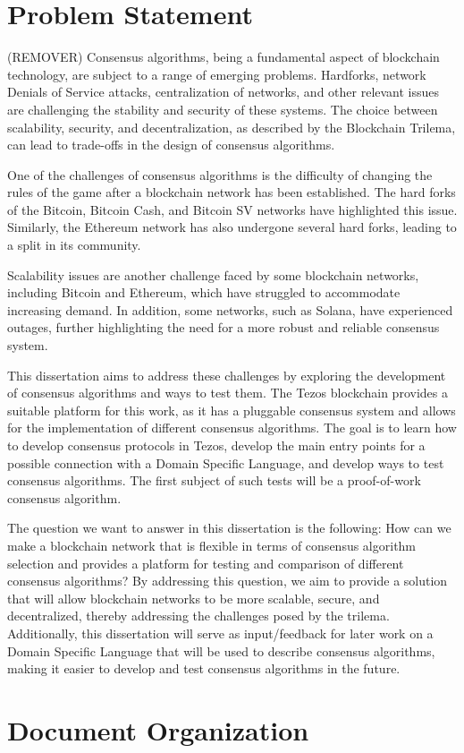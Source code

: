 \section*{Problem Statement}
(REMOVER)
Consensus algorithms, being a fundamental aspect of blockchain technology, are subject to a range of emerging problems. Hardforks, network Denials of Service attacks, centralization of networks, and other relevant issues are challenging the stability and security of these systems. The choice between scalability, security, and decentralization, as described by the Blockchain Trilema, can lead to trade-offs in the design of consensus algorithms.

One of the challenges of consensus algorithms is the difficulty of changing the rules of the game after a blockchain network has been established. The hard forks of the Bitcoin, Bitcoin Cash, and Bitcoin SV networks have highlighted this issue. Similarly, the Ethereum network has also undergone several hard forks, leading to a split in its community.

Scalability issues are another challenge faced by some blockchain networks, including Bitcoin and Ethereum, which have struggled to accommodate increasing demand. In addition, some networks, such as Solana, have experienced outages, further highlighting the need for a more robust and reliable consensus system.

This dissertation aims to address these challenges by exploring the development of consensus algorithms and ways to test them. The Tezos blockchain provides a suitable platform for this work, as it has a pluggable consensus system and allows for the implementation of different consensus algorithms. The goal is to learn how to develop consensus protocols in Tezos, develop the main entry points for a possible connection with a Domain Specific Language, and develop ways to test consensus algorithms. 
The first subject of such tests will be a proof-of-work consensus algorithm.

The question we want to answer in this dissertation is the following: How can we make a blockchain network that is flexible in terms of consensus algorithm selection and provides a platform for testing and comparison of different consensus algorithms? By addressing this question, we aim to provide a solution that will allow blockchain networks to be more scalable, secure, and decentralized, thereby addressing the challenges posed by the trilema. Additionally, this dissertation will serve as input/feedback for later work on a Domain Specific Language that will be used to describe consensus algorithms, making it easier to develop and test consensus algorithms in the future.

\section{Document Organization}
